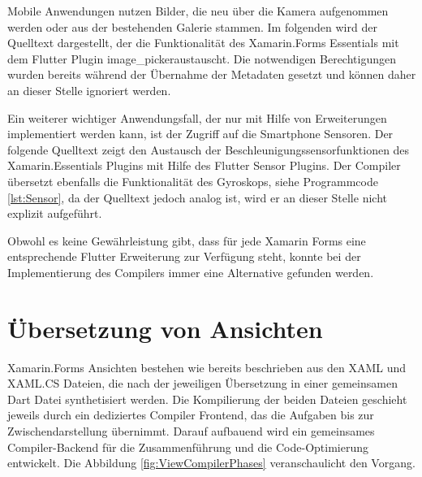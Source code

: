 Mobile Anwendungen nutzen Bilder, die neu über die Kamera aufgenommen werden oder aus der bestehenden Galerie stammen.  Im folgenden wird der Quelltext dargestellt, der die Funktionalität des Xamarin.Forms Essentials mit dem Flutter Plugin \glq image\_picker\grq austauscht.  Die notwendigen Berechtigungen wurden bereits während der Übernahme der Metadaten gesetzt und können daher an dieser Stelle ignoriert werden.



Ein weiterer wichtiger Anwendungsfall,  der nur mit Hilfe von Erweiterungen implementiert werden kann,  ist der Zugriff auf die Smartphone Sensoren.  Der folgende Quelltext zeigt den Austausch der Beschleunigungssensorfunktionen des Xamarin.Essentials Plugins mit Hilfe des Flutter Sensor Plugins.  Der Compiler übersetzt ebenfalls die Funktionalität des Gyroskops, siehe Programmcode \ref{lst:Sensor},  da der Quelltext jedoch analog ist, wird er an dieser Stelle nicht explizit aufgeführt. 



 Obwohl es keine Gewährleistung gibt, dass für jede Xamarin Forms eine entsprechende Flutter 
Erweiterung zur Verfügung steht, konnte bei der Implementierung des Compilers immer eine  Alternative gefunden werden.


\section{Übersetzung von Ansichten}
Xamarin.Forms Ansichten bestehen wie bereits beschrieben aus den XAML und XAML.CS Dateien, die nach der jeweiligen Übersetzung  in einer gemeinsamen Dart Datei synthetisiert werden.  
Die Kompilierung der beiden Dateien geschieht jeweils durch ein dediziertes Compiler Frontend, das die Aufgaben bis zur Zwischendarstellung übernimmt.  Darauf aufbauend wird ein gemeinsames Compiler-Backend für die Zusammenführung und die Code-Optimierung entwickelt.  Die Abbildung  \ref{fig:ViewCompilerPhases} veranschaulicht den Vorgang. 

